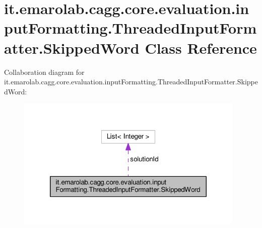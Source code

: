 \hypertarget{classit_1_1emarolab_1_1cagg_1_1core_1_1evaluation_1_1inputFormatting_1_1ThreadedInputFormatter_1_1SkippedWord}{\section{it.\-emarolab.\-cagg.\-core.\-evaluation.\-input\-Formatting.\-Threaded\-Input\-Formatter.\-Skipped\-Word Class Reference}
\label{classit_1_1emarolab_1_1cagg_1_1core_1_1evaluation_1_1inputFormatting_1_1ThreadedInputFormatter_1_1SkippedWord}
}


Collaboration diagram for it.\-emarolab.\-cagg.\-core.\-evaluation.\-input\-Formatting.\-Threaded\-Input\-Formatter.\-Skipped\-Word\-:\nopagebreak
\begin{figure}[H]
\begin{center}
\leavevmode
\includegraphics[width=310pt]{classit_1_1emarolab_1_1cagg_1_1core_1_1evaluation_1_1inputFormatting_1_1ThreadedInputFormatter_1_1SkippedWord__coll__graph}
\end{center}
\end{figure}
